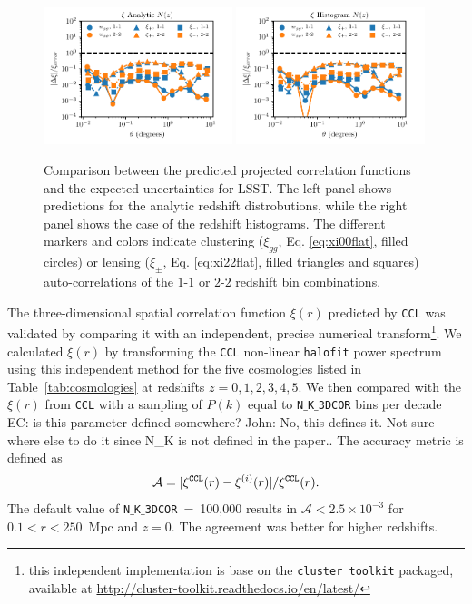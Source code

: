 \documentclass[\docopts]{\docclass}
\newcommand{\elisa}[1]{\textcolor{green!10!orange!90!}{EC: #1}}
\newcommand{\ccl}{{\tt CCL}\xspace}
\newcommand{\halofit}{{\tt halofit}\xspace}
\begin{document}
\begin{figure}
\centering
\includegraphics[width=0.49\textwidth]{projected_correlation_error_comparison_analytic} 
\includegraphics[width=0.49\textwidth]{projected_correlation_error_comparison_histo} 
\caption{Comparison between the predicted projected correlation functions and the expected uncertainties for LSST. The left panel shows predictions for the analytic redshift distrobutions, while the right panel shows the case of the redshift histograms. The different markers and colors indicate clustering ($\xi_{gg}$, Eq. \ref{eq:xi00flat}, filled circles) or lensing ($\xi_{\pm}$, Eq. \ref{eq:xi22flat}, filled triangles and squares) auto-correlations of the $1$-$1$ or $2$-$2$ redshift bin combinations.}
\label{fig:corrval}
\end{figure}

  
The three-dimensional spatial correlation function $\xi(r)$ predicted by \ccl was validated by comparing it with an independent, precise numerical transform\footnote{this independent implementation is base on the {\tt cluster toolkit} packaged, available at \url{http://cluster-toolkit.readthedocs.io/en/latest/}}. We calculated $\xi(r)$  by transforming the \ccl non-linear \halofit power spectrum using this independent method for the five cosmologies listed in Table~\ref{tab:cosmologies} at redshifts $z = 0,1,2,3,4,5$.  We then compared with the $\xi(r)$ from \ccl with a sampling of $P(k)$ equal to {\tt N$\_$K$\_$3DCOR} bins per decade \elisa{is this parameter defined somewhere? John: No, this defines it. Not sure where else to do it since N\_K is not defined in the paper.}. The accuracy metric is defined as
\begin{equation}
  \mathcal{A}=|\xi^{\tt CCL}(r)-\xi^{(i)}(r)| / \xi^{\tt CCL}(r).
  \label{eq:accxi}
\end{equation}
The default value of {\tt N$\_$K$\_$3DCOR}~=~100,000 results in $\mathcal{A} < 2.5 \times 10^{-3}$ for $0.1 < r < 250$~Mpc and $z=0$. The agreement was better for higher redshifts.
\end{document}
